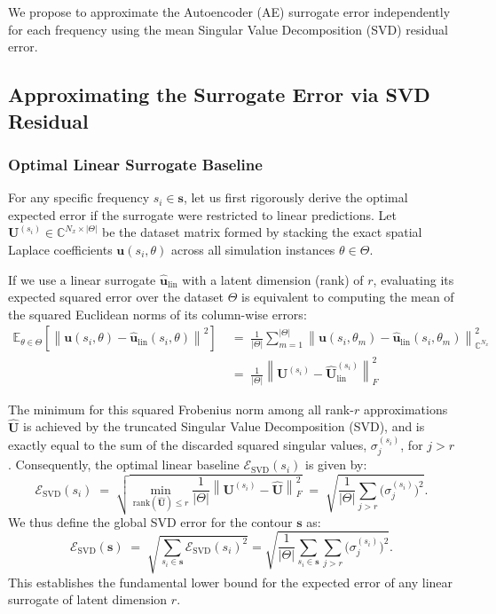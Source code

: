 \documentclass[11pt, a4paper]{article}
\newcommand{\C}{\mathbb{C}}
\newcommand{\E}{\mathbb{E}}
\newcommand{\norm}[1]{\left\|#1\right\|}
\begin{document}
We propose to approximate the Autoencoder (AE) surrogate error independently for each frequency using the mean Singular Value Decomposition (SVD) residual error.

\subsection{Approximating the Surrogate Error via SVD Residual}

\subsubsection{Optimal Linear Surrogate Baseline}

For any specific frequency $s_i \in \mathbf{s}$, let us first rigorously derive the optimal expected error if the surrogate were restricted to linear predictions. Let $\mathbf{U}^{(s_i)} \in \C^{N_x \times |\Theta|}$ be the dataset matrix formed by stacking the exact spatial Laplace coefficients $\mathbf{u}(s_i, \theta)$ across all simulation instances $\theta \in \Theta$. 

If we use a linear surrogate $\hat{\mathbf{u}}_{\mathrm{lin}}$ with a latent dimension (rank) of $r$, evaluating its expected squared error over the dataset $\Theta$ is equivalent to computing the mean of the squared Euclidean norms of its column-wise errors:
\begin{equation}
    \begin{aligned}
        \E_{\theta \in \Theta}\!\left[\norm{\mathbf{u}(s_i, \theta) - \hat{\mathbf{u}}_{\mathrm{lin}}(s_i, \theta)}^2\right] 
        \;&=\; \frac{1}{|\Theta|} \sum_{m=1}^{|\Theta|} \norm{\mathbf{u}(s_i, \theta_m) - \hat{\mathbf{u}}_{\mathrm{lin}}(s_i, \theta_m)}_{\C^{N_x}}^2 \\
        \;&=\; \frac{1}{|\Theta|} \norm{\mathbf{U}^{(s_i)} - \hat{\mathbf{U}}_{\mathrm{lin}}^{(s_i)}}_F^2
    \end{aligned}
\end{equation}

The minimum for this squared Frobenius norm among all rank-$r$ approximations $\hat{\mathbf{U}}$ is achieved by the truncated Singular Value Decomposition (SVD), and is exactly equal to the sum of the discarded squared singular values, $\sigma_j^{(s_i)}$, for $j > r$. Consequently, the optimal linear baseline $\mathcal{E}_{\mathrm{SVD}}(s_i)$ is given by:
\begin{equation}
    \mathcal{E}_{\mathrm{SVD}}(s_i) \;=\; \sqrt{ \min_{\mathrm{rank}(\hat{\mathbf{U}}) \leq r} \frac{1}{|\Theta|} \norm{\mathbf{U}^{(s_i)} - \hat{\mathbf{U}}}_F^2 } \;=\; \sqrt{ \frac{1}{|\Theta|} \sum_{j > r} \bigl(\sigma_j^{(s_i)}\bigr)^2 }.
\end{equation}
We thus define the global SVD error for the contour $\mathbf{s}$ as:
\begin{equation}
    \mathcal{E}_{\mathrm{SVD}}(\mathbf{s}) \;=\; \sqrt{ \sum_{s_i \in \mathbf{s}} \mathcal{E}_{\mathrm{SVD}}(s_i)^2 } = \sqrt{\frac{1}{|\Theta|}\sum_{s_i \in \mathbf{s}} \sum_{j > r} \bigl(\sigma_j^{(s_i)}\bigr)^2 }.
\end{equation}
This establishes the fundamental lower bound for the expected error of any linear surrogate of latent dimension $r$.
\end{document}
